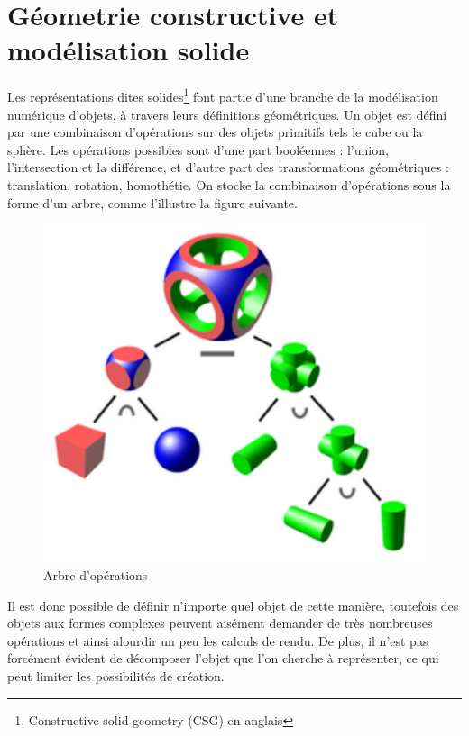 \documentclass{tnreport}
\begin{document}
\section{Géometrie constructive et modélisation solide}\label{sec:csg}
Les représentations dites solides\footnote{Constructive solid geometry (CSG) en anglais} font partie d'une branche de la modélisation numérique d'objets, à travers leurs définitions géométriques. Un objet est défini par une combinaison d'opérations sur des objets primitifs tels le cube ou la sphère. Les opérations possibles sont d'une part booléennes : l'union, l'intersection et la différence, et d'autre part des transformations géométriques : translation, rotation, homothétie. On stocke la combinaison d'opérations sous la forme d'un arbre, comme l'illustre la figure suivante. 
\begin{figure}[ht]
  \centering
  \includegraphics{figures/csg_tree}
  \caption{Arbre d'opérations}
  \label{fig:csg_tree}
\end{figure}
Il est donc possible de définir n'importe quel objet de cette manière, toutefois des objets aux formes complexes peuvent aisément demander de très nombreuses opérations et ainsi alourdir un peu les calculs de rendu. De plus, il n'est pas forcément évident de décomposer l'objet que l'on cherche à représenter, ce qui peut limiter les possibilités de création.
\end{document}

